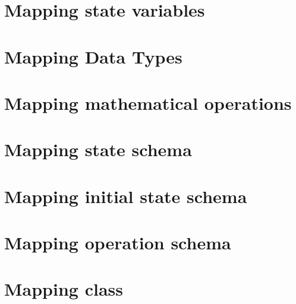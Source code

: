 \section{Mapping state variables}
\label{sec_tra_mapping_state_variables}


\section{Mapping Data Types}
\label{sec_tra_mapping_data_types}


\section{Mapping mathematical operations}
\label{sec_tra_mapping_mathematical_operations}


\section{Mapping state schema}
\label{sec_tra_mapping_state_schema}


\section{Mapping initial state schema}
\label{sec_tra_mapping_initial_state_schema}


\section{Mapping operation schema}
\label{sec_tra_mapping_operation_schema}


\section{Mapping class}
\label{sec_tra_mapping_class}




